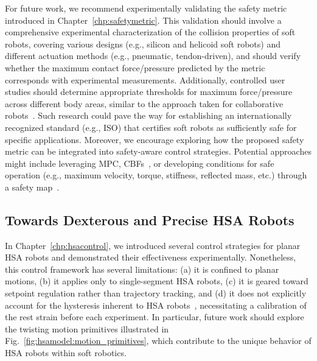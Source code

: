 For future work, we recommend experimentally validating the safety metric introduced in Chapter~\ref{chp:safetymetric}. This validation should involve a comprehensive experimental characterization of the collision properties of soft robots, covering various designs (e.g., silicon and helicoid soft robots) and different actuation methods (e.g., pneumatic, tendon-driven), and should verify whether the maximum contact force/pressure predicted by the metric corresponds with experimental measurements. Additionally, controlled user studies should determine appropriate thresholds for maximum force/pressure across different body areas, similar to the approach taken for collaborative robots~\citep{muttray2014kollaborierende}. Such research could pave the way for establishing an internationally recognized standard (e.g., ISO) that certifies soft robots as sufficiently safe for specific applications. Moreover, we encourage exploring how the proposed safety metric can be integrated into safety-aware control strategies. Potential approaches might include leveraging \gls{MPC}, \glspl{CBF}~\citep{ames2016control}, or developing conditions for safe operation (e.g., maximum velocity, torque, stiffness, reflected mass, etc.) through a safety map~\citep{mansfeld2018safety}.

\subsection{Towards Dexterous and Precise HSA Robots}
In Chapter~\ref{chp:hsacontrol}, we introduced several control strategies for planar \gls{HSA} robots and demonstrated their effectiveness experimentally. Nonetheless, this control framework has several limitations: (a) it is confined to planar motions, (b) it applies only to single-segment \gls{HSA} robots, (c) it is geared toward setpoint regulation rather than trajectory tracking, and (d) it does not explicitly account for the hysteresis inherent to HSA robots~\citep{truby2021recipe}, necessitating a calibration of the rest strain before each experiment. In particular, future work should explore the twisting motion primitives illustrated in Fig.~\ref{fig:hsamodel:motion_primitives}, which contribute to the unique behavior of \gls{HSA} robots within soft robotics.

